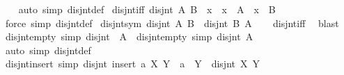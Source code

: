 \begin{isabellebody}
%
\isadelimproof
\ \ %
\endisadelimproof
%
\isatagproof
{}\isamarkupfalse%
\ {\isacharparenleft}{\kern0pt}auto\ simp{\isacharcolon}{\kern0pt}\ disjnt{\isacharunderscore}{\kern0pt}def{\isacharparenright}{\kern0pt}%
\endisatagproof
{\isafoldproof}%
%
\isadelimproof
\isanewline
%
\endisadelimproof
\isanewline
{}\isamarkupfalse%
\ disjnt{\isacharunderscore}{\kern0pt}iff{\isacharcolon}{\kern0pt}\ {\isachardoublequoteopen}disjnt\ A\ B\ {\isasymlongleftrightarrow}\ {\isacharparenleft}{\kern0pt}{\isasymforall}x{\isachardot}{\kern0pt}\ {\isasymnot}\ {\isacharparenleft}{\kern0pt}x\ {\isasymin}\ A\ {\isasymand}\ x\ {\isasymin}\ B{\isacharparenright}{\kern0pt}{\isacharparenright}{\kern0pt}{\isachardoublequoteclose}\isanewline
%
\isadelimproof
\ \ %
\endisadelimproof
%
\isatagproof
{}\isamarkupfalse%
\ {\isacharparenleft}{\kern0pt}force\ simp{\isacharcolon}{\kern0pt}\ disjnt{\isacharunderscore}{\kern0pt}def{\isacharparenright}{\kern0pt}%
\endisatagproof
{\isafoldproof}%
%
\isadelimproof
\isanewline
%
\endisadelimproof
\isanewline
{}\isamarkupfalse%
\ disjnt{\isacharunderscore}{\kern0pt}sym{\isacharcolon}{\kern0pt}\ {\isachardoublequoteopen}disjnt\ A\ B\ {\isasymLongrightarrow}\ disjnt\ B\ A{\isachardoublequoteclose}\isanewline
%
\isadelimproof
\ \ %
\endisadelimproof
%
\isatagproof
{}\isamarkupfalse%
\ disjnt{\isacharunderscore}{\kern0pt}iff\ \isamarkupfalse%
\ blast%
\endisatagproof
{\isafoldproof}%
%
\isadelimproof
\isanewline
%
\endisadelimproof
\isanewline
{}\isamarkupfalse%
\ disjnt{\isacharunderscore}{\kern0pt}empty{}\ {\isacharbrackleft}{\kern0pt}simp{\isacharbrackright}{\kern0pt}{\isacharcolon}{\kern0pt}\ {\isachardoublequoteopen}disjnt\ {\isacharbraceleft}{\kern0pt}{\isacharbraceright}{\kern0pt}\ A{\isachardoublequoteclose}\ \ disjnt{\isacharunderscore}{\kern0pt}empty{}\ {\isacharbrackleft}{\kern0pt}simp{\isacharbrackright}{\kern0pt}{\isacharcolon}{\kern0pt}\ {\isachardoublequoteopen}disjnt\ A\ {\isacharbraceleft}{\kern0pt}{\isacharbraceright}{\kern0pt}{\isachardoublequoteclose}\isanewline
%
\isadelimproof
\ \ %
\endisadelimproof
%
\isatagproof
{}\isamarkupfalse%
\ {\isacharparenleft}{\kern0pt}auto\ simp{\isacharcolon}{\kern0pt}\ disjnt{\isacharunderscore}{\kern0pt}def{\isacharparenright}{\kern0pt}%
\endisatagproof
{\isafoldproof}%
%
\isadelimproof
\isanewline
%
\endisadelimproof
\isanewline
{}\isamarkupfalse%
\ disjnt{\isacharunderscore}{\kern0pt}insert{}\ {\isacharbrackleft}{\kern0pt}simp{\isacharbrackright}{\kern0pt}{\isacharcolon}{\kern0pt}\ {\isachardoublequoteopen}disjnt\ {\isacharparenleft}{\kern0pt}insert\ a\ X{\isacharparenright}{\kern0pt}\ Y\ {\isasymlongleftrightarrow}\ a\ {\isasymnotin}\ Y\ {\isasymand}\ disjnt\ X\ Y{\isachardoublequoteclose}\isanewline

\end{isabellebody}

